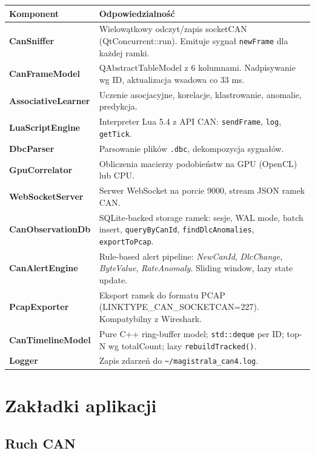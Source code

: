 \documentclass[a4paper,12pt]{article}
\begin{document}
\begin{tabularx}{\textwidth}{@{}>{\color{accent}\bfseries}lX@{}}
\toprule
\rowcolor{darkbg} Komponent & Odpowiedzialność \\
\midrule
CanSniffer & Wielowątkowy odczyt/zapis socketCAN (QtConcurrent::run). Emituje sygnał \texttt{newFrame} dla każdej ramki. \\
CanFrameModel & QAbstractTableModel z 6 kolumnami. Nadpisywanie wg ID, aktualizacja wsadowa co 33 ms. \\
AssociativeLearner & Uczenie asocjacyjne, korelacje, klastrowanie, anomalie, predykcja. \\
LuaScriptEngine & Interpreter Lua 5.4 z API CAN: \texttt{sendFrame}, \texttt{log}, \texttt{getTick}. \\
DbcParser & Parsowanie plików \texttt{.dbc}, dekompozycja sygnałów. \\
GpuCorrelator & Obliczenia macierzy podobieństw na GPU (OpenCL) lub CPU. \\
WebSocketServer & Serwer WebSocket na porcie 9000, stream JSON ramek CAN. \\
\color{pink}CanObservationDb & SQLite-backed storage ramek: sesje, WAL mode, batch insert, \texttt{queryByCanId}, \texttt{findDlcAnomalies}, \texttt{exportToPcap}. \\
\color{pink}CanAlertEngine & Rule-based alert pipeline: \textit{NewCanId}, \textit{DlcChange}, \textit{ByteValue}, \textit{RateAnomaly}. Sliding window, lazy state update. \\
\color{pink}PcapExporter & Eksport ramek do formatu PCAP (LINKTYPE\_CAN\_SOCKETCAN=227). Kompatybilny z Wireshark. \\
\color{pink}CanTimelineModel & Pure C++ ring-buffer model; \texttt{std::deque} per ID; top-N wg totalCount; lazy \texttt{rebuildTracked()}. \\
Logger & Zapis zdarzeń do \texttt{\textasciitilde/magistrala\_can4.log}. \\
\bottomrule
\end{tabularx}

\section{Zakładki aplikacji}

\subsection{Ruch CAN}
\end{document}
